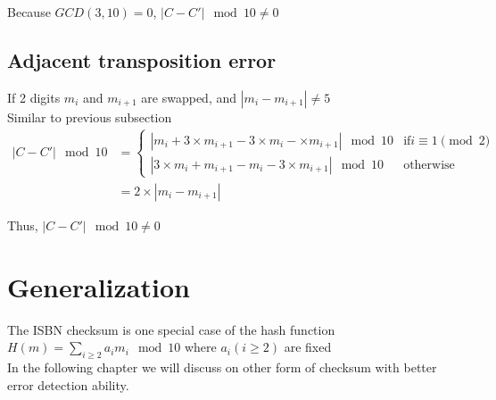 Because $GCD(3, 10) = 0$, $|C-C'| \mod 10 \ne 0$
\subsection{Adjacent transposition error}
If 2 digits $m_i$ and $m_{i+1}$ are swapped, and $|m_i-m_{i+1}| \neq 5$\\
Similar to previous subsection
\begin{equation}
\begin{split}
|C - C'| \mod 10 & =
\begin{cases}
|m_i + 3 \times m_{i+1} - 3 \times m_i - \times m_{i+1}| \mod 10 &\text{if} i \equiv 1 \pmod{2}
\\
 |3 \times m_i + m_{i+1} - m_i - 3 \times m_{i+1}| \mod 10 &\text{otherwise}
\end{cases}
\\
& = 2 \times |m_i - m_{i+1}|
\end{split}
\end{equation}

Thus, $|C-C'| \mod 10 \neq 0$

\section{Generalization}
The ISBN checksum is one special case of the hash function $H(m) = \sum_{i \geq 2}a_im_i \mod 10$ where $a_i(i \geq 2)$ are fixed\\
In the following chapter we will discuss on other form of checksum with better error detection ability.